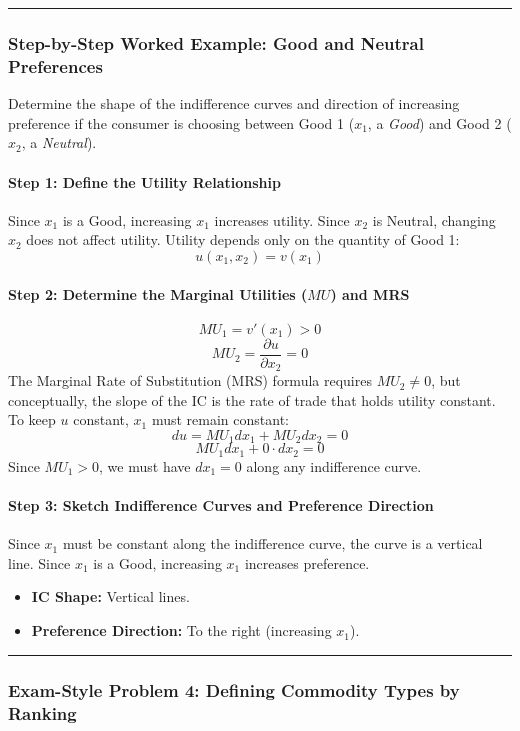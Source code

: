 \documentclass{article}
\begin{document}
\noindent\rule{\linewidth}{0.4pt}

\subsubsection*{Step-by-Step Worked Example: Good and Neutral Preferences}

Determine the shape of the indifference curves and direction of increasing preference if the consumer is choosing between Good 1 ($x_1$, a \textit{Good}) and Good 2 ($x_2$, a \textit{Neutral}).

\paragraph*{Step 1: Define the Utility Relationship}
Since $x_1$ is a Good, increasing $x_1$ increases utility. Since $x_2$ is Neutral, changing $x_2$ does not affect utility. Utility depends only on the quantity of Good 1:
$$u(x_1, x_2) = v(x_1)$$

\paragraph*{Step 2: Determine the Marginal Utilities ($MU$) and MRS}
$$MU_1 = v'(x_1) > 0$$
$$MU_2 = \frac{\partial u}{\partial x_2} = 0$$
The Marginal Rate of Substitution (MRS) formula requires $MU_2 \neq 0$, but conceptually, the slope of the IC is the rate of trade that holds utility constant. To keep $u$ constant, $x_1$ must remain constant:
$$du = MU_1 dx_1 + MU_2 dx_2 = 0$$
$$MU_1 dx_1 + 0 \cdot dx_2 = 0$$
Since $MU_1 > 0$, we must have $dx_1 = 0$ along any indifference curve.

\paragraph*{Step 3: Sketch Indifference Curves and Preference Direction}
Since $x_1$ must be constant along the indifference curve, the curve is a vertical line. Since $x_1$ is a Good, increasing $x_1$ increases preference.

\begin{itemize}
    \item \textbf{IC Shape:} Vertical lines.
    \item \textbf{Preference Direction:} To the right (increasing $x_1$).
\end{itemize}

\noindent\rule{\linewidth}{0.4pt}

\subsubsection*{Exam-Style Problem 4: Defining Commodity Types by Ranking}
\end{document}
